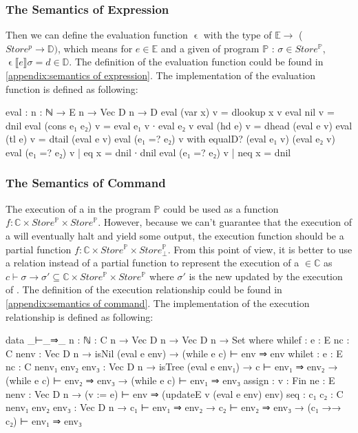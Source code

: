 \subsubsection{The Semantics of Expression}
Then we can define the evaluation function $\upvarepsilon$ with the type of $\mathds{E} \longrightarrow $ ($Store^p \rightarrow \mathds{D})$, 
which means for $e \in \mathds{E}$ and a given  of program $\mathds{P}$ : $\sigma \in Store^{\mathds{P}}$, $\upvarepsilon \llbracket e \rrbracket \sigma = d \in \mathds{D}$.
The definition of the evaluation function could be found in \ref{appendix:semantics of expression}.
The \Agda implementation of the evaluation function is defined as following:
\begin{code}[fontsize=\footnotesize]
eval : {n : ℕ} → E n → Vec D n → D
eval (var x) v = dlookup x v
eval nil v = dnil
eval (cons e₁ e₂) v = eval e₁ v ∙ eval e₂ v
eval (hd e) v = dhead (eval e v)
eval (tl e) v = dtail (eval e v)
eval (e₁ =? e₂) v with equalD? (eval e₁ v) (eval e₂ v)
eval (e₁ =? e₂) v | eq x = dnil ∙ dnil
eval (e₁ =? e₂) v | neq x = dnil
\end{code}
\subsubsection{The Semantics of Command}
The execution of a  in the program $\mathds{P}$ could be used as a function $f : \mathds{C} \times Store^{\mathds{P}} \times Store^{\mathds{P}}$.
However, because we can't guarantee that the execution of a  will eventually halt and yield some output, the execution function should be a partial function $f : \mathds{C} \times Store^{\mathds{P}} \times Store^{\mathds{P}}_\bot$.
From this point of view, it is better to use a relation instead of a partial function to represent the execution of a   $\in \mathds{C}$ as $c \vdash \sigma \rightarrow \sigma' \subseteq \mathds{C} \times Store^{\mathds{P}} \times Store^{\mathds{P}}$ where $\sigma'$ is the new  updated by the execution of  .
The definition of the execution  relationship could be found in \ref{appendix:semantics of command}.
The \Agda implementation of the execution relationship is defined as following:
\begin{code}[fontsize=\footnotesize]
data _⊢_⇒_ {n : ℕ} : C n → Vec D n  → Vec D n → Set where
  whilef : {e : E n}{c : C n}{env : Vec D n}
         → isNil (eval e env)
         → (while e c) ⊢ env ⇒ env
  whilet : {e : E n}{c : C n}{env₁ env₂ env₃ : Vec D n}
         → isTree (eval e env₁)
         → c ⊢ env₁ ⇒ env₂
         → (while e c) ⊢ env₂ ⇒ env₃
         → (while e c) ⊢ env₁ ⇒ env₃
  assign : {v : Fin n}{e : E n}{env : Vec D n}
         → (v := e) ⊢ env ⇒ (updateE v (eval e env) env)
  seq    : {c₁ c₂ : C n}{env₁ env₂ env₃ : Vec D n}
         → c₁ ⊢ env₁ ⇒ env₂
         → c₂ ⊢ env₂ ⇒ env₃
         → (c₁ →→ c₂) ⊢ env₁ ⇒ env₃
\end{code}
